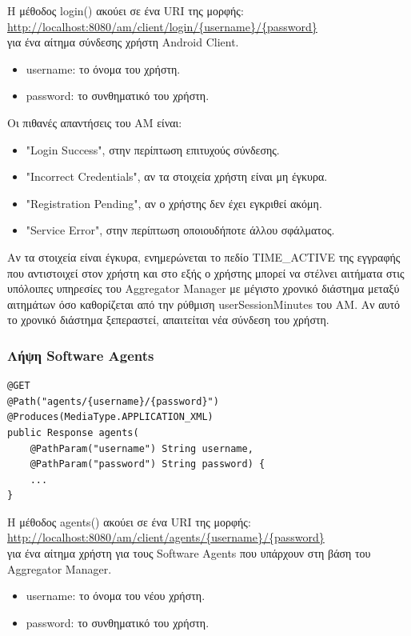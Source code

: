 \documentclass[a4paper,11pt]{article}
\begin{document}
\begin{sloppypar}
\begin{lstlisting}
\end{lstlisting}
Η μέθοδος login() ακούει σε ένα URI της μορφής:
\\
\url{http://localhost:8080/am/client/login/{username}/{password}}
\\
για ένα αίτημα σύνδεσης χρήστη Android Client.

\begin{itemize}

\item username: το όνομα του χρήστη.
\item password: το συνθηματικό του χρήστη.

\end{itemize}
Οι πιθανές απαντήσεις του AM είναι:
\begin{itemize}
\item "Login Success", στην περίπτωση επιτυχούς σύνδεσης.
\item "Incorrect Credentials", αν τα στοιχεία χρήστη είναι μη έγκυρα.
\item "Registration Pending", αν ο χρήστης δεν έχει εγκριθεί ακόμη.
\item "Service Error", στην περίπτωση οποιουδήποτε άλλου σφάλματος.
\end{itemize}
Αν τα στοιχεία είναι έγκυρα, ενημερώνεται το πεδίο TIME\_ACTIVE της εγγραφής που αντιστοιχεί στον χρήστη και στο εξής ο χρήστης μπορεί να στέλνει αιτήματα στις υπόλοιπες υπηρεσίες του Aggregator Manager με μέγιστο χρονικό διάστημα μεταξύ αιτημάτων όσο καθορίζεται από την ρύθμιση userSessionMinutes του AM. Αν αυτό το χρονικό διάστημα ξεπεραστεί, απαιτείται νέα σύνδεση του χρήστη.

\subsubsection{Λήψη Software Agents}
\begin{lstlisting}
@GET
@Path("agents/{username}/{password}")
@Produces(MediaType.APPLICATION_XML)
public Response agents(
    @PathParam("username") String username,
    @PathParam("password") String password) {
    ...
}
\end{lstlisting}
Η μέθοδος agents() ακούει σε ένα URI της μορφής:
\\
\url{http://localhost:8080/am/client/agents/{username}/{password}}
\\
για ένα αίτημα χρήστη για τους Software Agents που υπάρχουν στη βάση του Aggregator Manager.
\begin{itemize}

\item username: το όνομα του νέου χρήστη.
\item password: το συνθηματικό του χρήστη.


\end{itemize}
\end{sloppypar}
\end{document}
